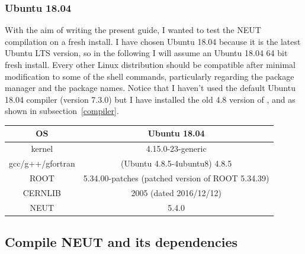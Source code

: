 \subsubsection{Ubuntu 18.04}
With the aim of writing the present guide, I wanted to test the NEUT compilation
on a fresh install. I have chosen Ubuntu 18.04 because it is the latest Ubuntu
LTS version, so in the following I will assume an Ubuntu 18.04 64 bit fresh
install.  Every other Linux distribution should be compatible after minimal
modification to some of the shell commands, particularly regarding the package
manager and the package names. Notice that I haven't used the default Ubuntu
18.04 compiler (version 7.3.0) but I have installed the old 4.8 version of
,  and  as shown in
subsection~\ref{compiler}.
\begin{center}
  \begin{tabular}{||c | c||} %
    \hline %
    OS & Ubuntu 18.04 \\ [0.5ex] 
    \hline\hline %
    kernel & 4.15.0-23-generic \\ 
    \hline %
    gcc/g++/gfortran & (Ubuntu 4.8.5-4ubuntu8) 4.8.5 \\
    \hline %
    ROOT & 5.34.00-patches (patched version of ROOT 5.34.39) \\
    \hline %
    CERNLIB & 2005 (dated 2016/12/12) \\
    \hline %
    NEUT & 5.4.0 \\ [1ex] 
    \hline
  \end{tabular}
\end{center}

\subsection{Compile NEUT and its dependencies}

